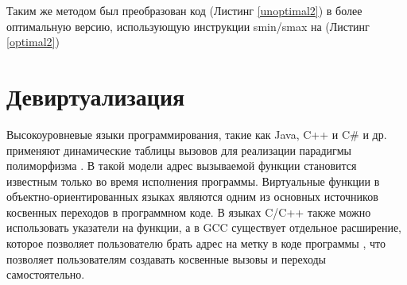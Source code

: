 Таким  же методом был преобразован код  (Листинг \ref{unoptimal2}) в более оптимальную версию, использующую инструкции smin/smax на (Листинг \ref{optimal2})



\section {Девиртуализация} \label{opt:devirt}
 Высокоуровневые языки программирования, такие как Java, C++ и C\# и др. применяют динамические таблицы вызовов для реализации парадигмы полиморфизма \cite{calder1994quantifying,suganuma2000overview,bauer2021novt}.  В такой модели адрес вызываемой функции становится известным только во время исполнения программы. Виртуальные функции в объектно-ориентированных языках являются одним из основных источников косвенных переходов в программном коде. В языках C/C++ также можно использовать указатели на функции, а в GCC  существует отдельное расширение, которое позволяет пользователю брать адрес на метку в коде программы \cite{shah1995function}, что  позволяет пользователям создавать косвенные вызовы и переходы самостоятельно. 
 

